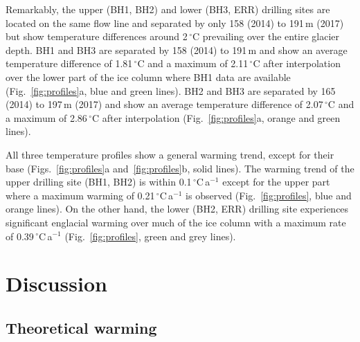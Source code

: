 \documentclass[utf8]{article}
\begin{document}
    Remarkably, the upper (BH1, BH2) and lower (BH3, ERR) drilling sites are
    located on the same flow line and separated by only 158 (2014) to 191\,m
    (2017) but show temperature differences around 2\,$^\circ$C prevailing over
    the entire glacier depth.  BH1 and BH3 are separated by 158 (2014) to
    191\,m and show an average temperature difference of 1.81\,$^\circ$C and a
    maximum of 2.11\,$^\circ$C after interpolation over the lower part of the
    ice column where BH1 data are available (Fig.~\ref{fig:profiles}a, blue and
    green lines). BH2 and BH3 are separated by 165 (2014) to 197\,m (2017) and
    show an average temperature difference of 2.07\,$^\circ$C and a maximum of
    2.86\,$^\circ$C after interpolation (Fig.~\ref{fig:profiles}a, orange and
    green lines).

    All three temperature profiles show a general warming trend, except for
    their base (Figs.~\ref{fig:profiles}a and~\ref{fig:profiles}b, solid
    lines). The warming trend of the upper drilling site (BH1, BH2) is
    within 0.1\,$^\circ$C\,a$^{-1}$ except for the upper part where a maximum
    warming of 0.21\,$^\circ$C\,a$^{-1}$ is observed (Fig.~\ref{fig:profiles},
    blue and orange lines). On the other hand, the lower (BH2, ERR) drilling
    site experiences significant englacial
    warming over much of the ice column with a maximum rate of
    0.39\,$^\circ$C\,a$^{-1}$ (Fig.~\ref{fig:profiles}, green and grey lines).


\section{Discussion}

\subsection{Theoretical warming}
\end{document}
